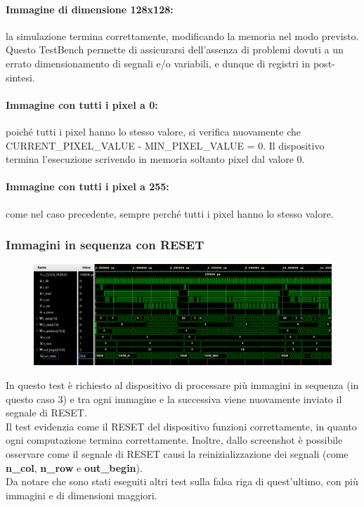 \documentclass[a4paper, 12pt]{article}
\begin{document}
\paragraph*{Immagine di dimensione 128x128:}
la simulazione termina correttamente, modificando la memoria nel modo previsto.\\
Questo TestBench permette di assicurarsi dell'assenza di problemi dovuti a un errato dimensionamento di segnali e/o variabili, e dunque di registri in post-sintesi.
\paragraph*{Immagine con tutti i pixel a 0:}
poiché tutti i pixel hanno lo stesso valore, si verifica nuovamente che CURRENT\_PIXEL\_VALUE - MIN\_PIXEL\_VALUE = 0. Il dispositivo termina l'esecuzione scrivendo in memoria soltanto pixel dal valore 0.
\paragraph{Immagine con tutti i pixel a 255:}
come nel caso precedente, sempre perché tutti i pixel hanno lo stesso valore. 

\subsubsection{Immagini in sequenza con RESET}
\begin{figure}[h]
    \centering
    \includegraphics[trim=0cm 1.25cm 0cm 0.25cm, width=1.0\textwidth]{simulazioni/GEN_RESET.png}
    \label{fig:gen_reset}
\end{figure}
In questo test è richiesto al dispositivo di processare più immagini in sequenza (in questo caso 3) e tra ogni immagine e la successiva viene nuovamente inviato il segnale di RESET. \\
Il test evidenzia come il RESET del dispositivo funzioni correttamente, in quanto ogni computazione termina correttamente. Inoltre, dallo screenshot è possibile osservare come il segnale di RESET causi la reinizializzazione dei segnali (come \textbf{n\_col}, \textbf{ n\_row} e \textbf{out\_begin}). \\
Da notare che sono stati eseguiti altri test sulla falsa riga di quest'ultimo, con più immagini e di dimensioni maggiori.
\end{document}
